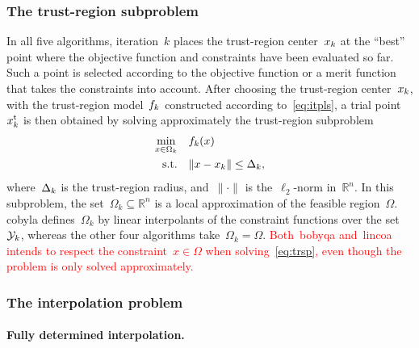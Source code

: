 \documentclass[
    smallextended,  %
    draft,          %
]{svjour3}
\newcommand{\R}{\mathbb{R}}
\newcommand{\fsetm}[1][k]{\Omega_{#1}}
\newcommand{\fset}{\Omega}
\newcommand{\iter}[1][k]{x\ifthenelse{\equal{#1}{}}{}{_{#1}}}
\newcommand{\norm}[2][]{#1\lVert#2#1\rVert}
\newcommand{\objm}[1][k]{\obj\ifthenelse{\equal{#1}{}}{}{_{#1}}}
\newcommand{\obj}{f}
\newcommand{\rad}[1][k]{\Delta\ifthenelse{\equal{#1}{}}{}{_{#1}}}
\newcommand{\st}{\text{s.t.}}
\newcommand{\trust}{{\text{t}}}
\newcommand{\xpt}[1][k]{\mathcal{Y}\ifthenelse{\equal{#1}{}}{}{_{#1}}}
\newcommand{\red}{\textcolor{red}}
\begin{document}
\subsubsection{The trust-region subproblem}

In all five algorithms, iteration~$k$ places the trust-region center~$\iter$ at the ``best'' point where the objective function and constraints have been evaluated so far.
Such a point is selected according to the objective function or a merit function that takes the constraints into account.
After choosing the trust-region center~$\iter$, with the trust-region model~$\objm$ constructed
according to~\eqref{eq:itpls}, a trial point~$\iter^{\trust}$ is then obtained by solving approximately the trust-region subproblem
\begin{equation}
    \label{eq:trsp}
    \begin{split}
        \min_{x \in \fsetm} & \quad \objm(x)\\
        \st                 & \quad \norm{x - \iter} \le \rad,
    \end{split}
\end{equation}
where~$\rad$ is the trust-region radius, and~$\norm{\cdot}$ is the~$\ell_2$-norm in~$\R^n$.
In this subproblem, the set~$\fsetm \subseteq \R^n$ is a local approximation of the feasible region~$\fset$.
\Gls{cobyla} defines~$\fsetm$ by linear interpolants of the constraint functions over the set~$\xpt$,
whereas the other four algorithms take~$\fsetm = \fset$.
\red{
Both~\gls{bobyqa} and~\gls{lincoa} intends to respect the constraint~$x\in\fset$ when
solving~\eqref{eq:trsp}, even though the problem is only solved approximately.
}

\subsubsection{The interpolation problem}

\paragraph{Fully determined interpolation.}
\end{document}
